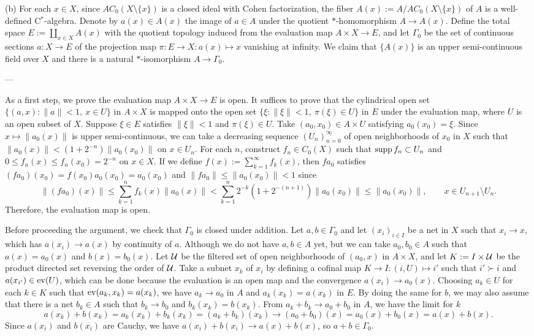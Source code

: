 \documentclass{../../large}
\begin{document}
\begin{pf}


(b)
For each $x\in X$, since $AC_0(X\setminus\{x\})$ is a closed ideal with Cohen factorization, the fiber $A(x):=A/AC_0(X\setminus\{x\})$ of $A$ is a well-defined C$^*$-algebra.
Denote by $a(x)\in A(x)$ the image of $a\in A$ under the quotient $*$-homomorphism $A\to A(x)$.
Define the total space $E:=\coprod_{x\in X}A(x)$ with the quotient topology induced from the evaluation map $A\times X\to E$, and let $\Gamma_0$ be the set of continuous sections $a:X\to E$ of the projection map $\pi:E\to X:a(x)\mapsto x$ vanishing at infinity.
We claim that $\{A(x)\}$ is an upper semi-continuous field over $X$ and there is a natural $*$-isomorphism $A\to\Gamma_0$.

---

As a first step, we prove the evaluation map $A\times X\to E$ is open.
It suffices to prove that the cylindrical open set $\{(a,x):\|a\|<1,\ x\in U\}$ in $A\times X$ is mapped onto the open set $\{\xi:\|\xi\|<1,\ \pi(\xi)\in U\}$ in $E$ under the evaluation map, where $U$ is an open subset of $X$.
Suppose $\xi\in E$ satisfies $\|\xi\|<1$ and $\pi(\xi)\in U$.
Take $(a_0,x_0)\in A\times U$ satisfying $a_0(x_0)=\xi$.
Since $x\mapsto\|a_0(x)\|$ is upper semi-continuous, we can take a decreasing sequence $(U_n)_{n=0}^\infty$ of open neighborhoods of $x_0$ in $X$ such that $\|a_0(x)\|<(1+2^{-n})\|a_0(x_0)\|$ on $x\in U_n$.
For each $n$, construct $f_n\in C_0(X)$ such that $\operatorname{supp} f_n\subset U_n$ and $0\le f_n(x)\le f_n(x_0)=2^{-n}$ on $x\in X$.
If we define $f(x):=\sum_{k=1}^\infty f_k(x)$, then $fa_0$ satisfies $(fa_0)(x_0)=f(x_0)a_0(x_0)=a_0(x_0)$ and $\|fa_0\|\le\|a_0(x_0)\|<1$ since
\[\|(fa_0)(x)\|\le\sum_{k=1}^nf_k(x)\|a_0(x)\|<\sum_{k=1}^n2^{-k}(1+2^{-(n+1)})\|a_0(x_0)\|\le\|a_0(x_0)\|,\qquad x\in U_{n+1}\setminus U_n.\]
Therefore, the evaluation map is open.

Before proceeding the argument, we check that $\Gamma_0$ is closed under addition.
Let $a,b\in\Gamma_0$ and let $(x_i)_{i\in I}$ be a net in $X$ such that $x_i\to x$, which has $a(x_i)\to a(x)$ by continuity of $a$.
Although we do not have $a,b\in A$ yet, but we can take $a_0,b_0\in A$ such that $a(x)=a_0(x)$ and $b(x)=b_0(x)$.
Let $\mathcal{U}$ be the filtered set of open neighborhoods of $(a_0,x)$ in $A\times X$, and let $K:=I\times\mathcal{U}$ be the product directed set reversing the order of $\mathcal{U}$.
Take a subnet $x_k$ of $x_i$ by defining a cofinal map $K\to I:(i,U)\mapsto i'$ such that $i'\succ i$ and $a(x_{i'})\in\operatorname{ev}(U)$, which can be done because the evaluation is an open map and the convergence $a(x_i)\to a_0(x)$.
Choosing $a_k\in U$ for each $k\in K$ such that $\operatorname{ev}(a_k,x_k)=a(x_k)$, we have $a_k\to a_0$ in $A$ and $a_k(x_k)=a(x_k)$ in $E$.
By doing the same for $b$, we may also assume that there is a net $b_k\in A$ such that $b_k\to b_0$ and $b_k(x_k)=b(x_k)$.
From $a_k+b_k\to a_0+b_0$ in $A$, we have the limit for $k$
\[a(x_k)+b(x_k)=a_k(x_k)+b_k(x_k)=(a_k+b_k)(x_k)\to(a_0+b_0)(x)=a_0(x)+b_0(x)=a(x)+b(x).\]
Since $a(x_i)$ and $b(x_i)$ are Cauchy, we have $a(x_i)+b(x_i)\to a(x)+b(x)$, so $a+b\in\Gamma_0$.



\end{pf}
\end{document}

